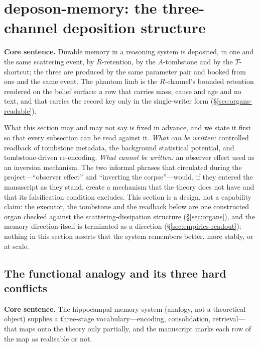 \documentclass[11pt,a4paper]{article}
\begin{document}
\section{deposon-memory: the three-channel deposition structure}
\label{sec:memory}

\textbf{Core sentence.} Durable memory in a reasoning system is deposited, in one and the same scattering event, by $R$-retention, by the $A$-tombstone and by the $T$-shortcut; the three are produced by the same parameter pair and booked from one and the same event. The phantom limb is the $R$-channel's bounded retention rendered on the belief surface: a row that carries mass, cause and age and no text, and that carries the record key only in the single-writer form (\S\ref{sec:organs-readable}).

What this section may and may not say is fixed in advance, and we state it first so that every subsection can be read against it. \emph{What can be written:} controlled readback of tombstone metadata, the background statistical potential, and tombstone-driven re-encoding. \emph{What cannot be written:} an observer effect used as an inversion mechanism. The two informal phrases that circulated during the project---``observer effect'' and ``inverting the corpse''---would, if they entered the manuscript as they stand, create a mechanism that the theory does not have and that its falsification condition excludes. This section is a design, not a capability claim: the executor, the tombstone and the readback below are one constructed organ checked against the scattering-dissipation structure (\S\ref{sec:organs}), and the memory direction itself is terminated as a direction (\S\ref{sec:empirics-readout}); nothing in this section asserts that the system remembers better, more stably, or at scale.

\subsection{The functional analogy and its three hard conflicts}
\label{sec:memory-analogy}

\textbf{Core sentence.} The hippocampal memory system (analogy, not a theoretical object) supplies a three-stage vocabulary---encoding, consolidation, retrieval---that maps onto the theory only partially, and the manuscript marks each row of the map as realisable or not.
\end{document}
